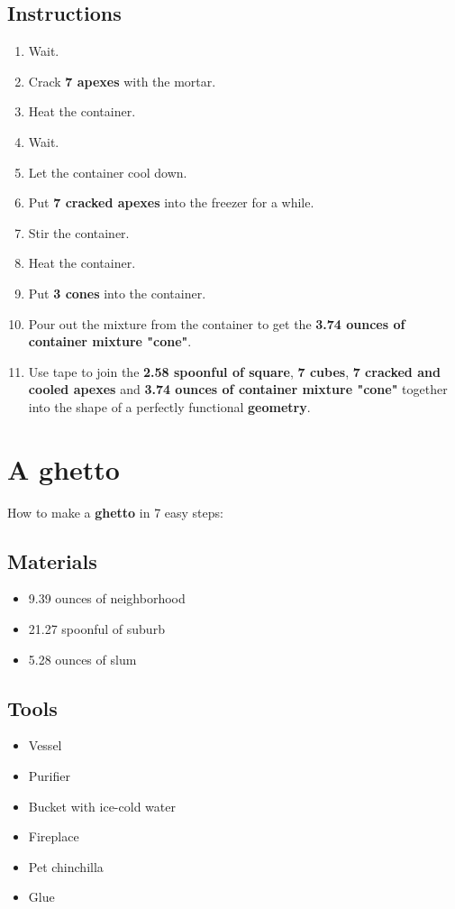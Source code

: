 \documentclass{article}
\begin{document}
\subsection{Instructions}\begin{enumerate}
\item 
Wait.
\item 
Crack \textbf{7 apexes} with the mortar.
\item 
Heat the container.
\item 
Wait.
\item 
Let the container cool down.
\item 
Put \textbf{7 cracked apexes} into the freezer for a while.
\item 
Stir the container.
\item 
Heat the container.
\item 
Put \textbf{3 cones} into the container.
\item 
Pour out the mixture from the container to get the \textbf{3.74 ounces of container mixture "cone"}.
\item 
Use tape to join the \textbf{2.58 spoonful of square}, \textbf{7 cubes}, \textbf{7 cracked and cooled apexes} and \textbf{3.74 ounces of container mixture "cone"} together into the shape of a perfectly functional \textbf{geometry}.
\end{enumerate}
\newpage
\section{A ghetto}How to make a \textbf{ghetto} in 7 easy steps:

\subsection{Materials}\begin{itemize}
\item 
9.39 ounces of neighborhood
\item 
21.27 spoonful of suburb
\item 
5.28 ounces of slum
\end{itemize}
\subsection{Tools}\begin{itemize}
\item 
Vessel
\item 
Purifier
\item 
Bucket with ice-cold water
\item 
Fireplace
\item 
Pet chinchilla
\item 
Glue
\end{itemize}
\end{document}
